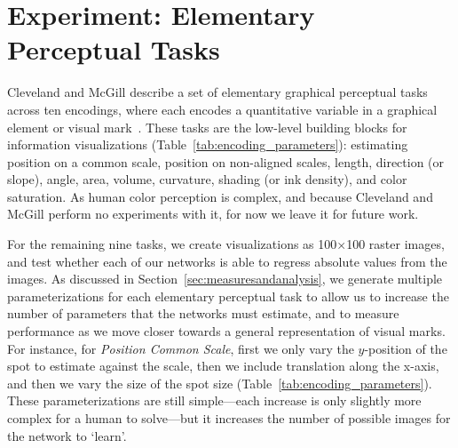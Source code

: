 \section{Experiment: Elementary Perceptual Tasks}

Cleveland and McGill describe a set of elementary graphical perceptual tasks across ten encodings, where each encodes a quantitative variable in a graphical element or visual mark~\cite{cleveland_mcgill,cleveland1985graphical}. These tasks are the low-level building blocks for information visualizations (Table~\ref{tab:encoding_parameters}): estimating position on a common scale, position on non-aligned scales, length, direction (or slope), angle, area, volume, curvature,  shading (or ink density), and color saturation. As human color perception is complex, and because Cleveland and McGill perform no experiments with it, for now we leave it for future work. 

For the remaining nine tasks, we create visualizations as 100$\times$100 raster images, and test whether each of our networks is able to regress absolute values from the images. As discussed in Section~\ref{sec:measuresandanalysis}, we generate multiple parameterizations for each elementary perceptual task to allow us to increase the number of parameters that the networks must estimate, and to measure performance as we move closer towards a general representation of visual marks. For instance, for \emph{Position Common Scale}, first we only vary the $y$-position of the spot to estimate against the scale, then we include translation along the x-axis, and then we vary the size of the spot size (Table~\ref{tab:encoding_parameters}). These parameterizations are still simple---each increase is only slightly more complex for a human to solve---but it increases the number of possible images for the network to `learn'.






